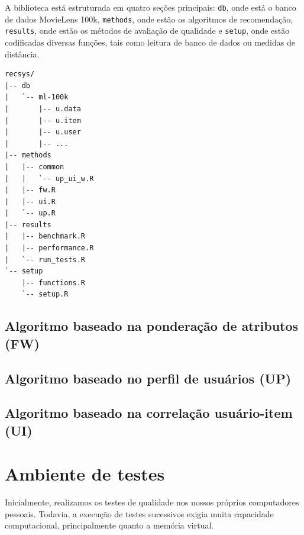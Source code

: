 A biblioteca está estruturada em quatro seções principais: \texttt{db}, onde está o banco de dados MovieLens 100k, \texttt{methods}, onde estão os algoritmos de recomendação, \texttt{results}, onde estão os métodos de avaliação de qualidade e \texttt{setup}, onde estão codificadas diversas funções, tais como leitura de banco de dados ou medidas de distância.

\begin{lstlisting}
recsys/
|-- db
|   `-- ml-100k
|       |-- u.data
|       |-- u.item
|       |-- u.user
|       |-- ...
|-- methods
|   |-- common
|   |   `-- up_ui_w.R
|   |-- fw.R
|   |-- ui.R
|   `-- up.R
|-- results
|   |-- benchmark.R
|   |-- performance.R
|   `-- run_tests.R
`-- setup
    |-- functions.R
    `-- setup.R
\end{lstlisting}




\subsection{Algoritmo baseado na ponderação de atributos (FW)} %
\label{sub:algoritmo_baseado_na_pondera_o_de_atributos_fw_}
\subsection{Algoritmo baseado no perfil de usuários (UP)} %
\label{sub:algoritmo_baseado_no_perfil_de_usu_rios_up_}
\subsection{Algoritmo baseado na correlação usuário-item (UI)} %
\label{sub:algoritmo_baseado_na_correla_o_usu_rio_item_ui_}




\section{Ambiente de testes} %
\label{sec:ambiente_de_testes}

Inicialmente, realizamos os testes de qualidade nos nossos próprios computadores pessoais. Todavia, a execução de testes sucessivos exigia muita capacidade computacional, principalmente quanto a memória virtual.

